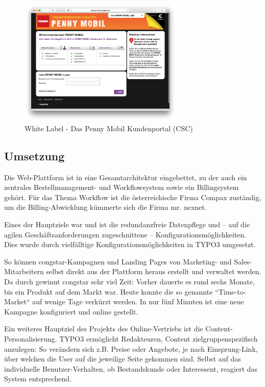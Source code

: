 \documentclass[11pt,a4paper]{article} %
\begin{document}
\begin{figure}[H]
\includegraphics[width=0.7\textwidth]{images/Sites/White_Label/Penny_Mobil_CSC.png}
\centering
\caption{White Label - Das Penny Mobil Kundenportal (CSC) \cite{pencsc}}
\end{figure}

\pagebreak

\subsection{Umsetzung}

Die Web-Plattform ist in eine Gesamtarchitektur eingebettet, zu der auch ein zentrales Bestellmanagement- und Workflowsystem sowie ein Billingsystem gehört. Für das Thema Workflow ist die österreichische Firma Compax zuständig, um die Billing-Abwicklung kümmerte sich die Firma mr. nexnet.

Eines der Hauptziele war und ist die redundanzfreie Datenpflege und – auf die agilen Geschäftsanforderungen zugeschnittene – Konfigurationsmöglichkeiten. Dies wurde durch vielfälltige Konfigurationsmöglichkeiten in TYPO3 umgesetzt.

So können congstar-Kampagnen und Landing Pages von Marketing- und Sales-Mitarbeitern selbst direkt aus der Plattform heraus erstellt und verwaltet werden. Da durch gewinnt congstar sehr viel Zeit: Vorher dauerte es rund sechs Monate, bis ein Produkt auf dem Markt war. Heute konnte die so genannte “Time-to-Market“ auf wenige Tage verkürzt werden. In nur fünf Minuten ist eine neue Kampagne konfiguriert und online gestellt.

Ein weiteres Hauptziel des Projekts des Online-Vertriebs ist die Content-Personalisierung. TYPO3 ermöglicht Redakteuren, Content zielgruppenspezifisch anzulegen: So verändern sich z.B. Preise oder Angebote, je nach Einsprung-Link, über welchen die User auf die jeweilige Seite gekommen sind. Selbst auf das individuelle Benutzer-Verhalten, ob Bestandskunde oder Interessent, reagiert das System entsprechend.
\end{document}

